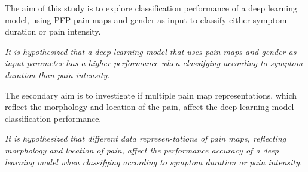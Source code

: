 \noindent
The aim of this study is to explore classification performance of a deep learning model, using PFP pain maps and gender as input to classify either symptom duration or pain intensity.


\begin{center}
\textit{It is hypothesized that a deep learning model that uses pain maps and gender as input parameter has a higher performance when classifying according to symptom duration than pain intensity.}
\end{center}

\noindent
The secondary aim is to investigate if multiple pain map representations, which reflect the morphology and location of the pain, affect the deep learning model classification performance.                                                    
\begin{center}
\textit{It is hypothesized that different data represen-\newline tations of pain maps, reflecting morphology and location of pain, affect the performance
accuracy of a deep learning model when classifying according to symptom duration or pain intensity.
}
\end{center}

